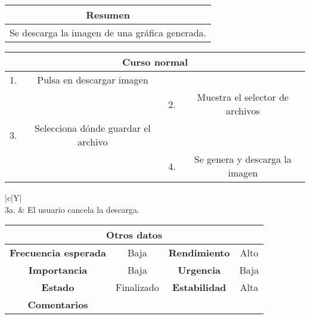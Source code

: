 \begin{table}[!h]
\begin{tabular}{|c|}
\hline
\cellcolor{cyan} \textbf{Resumen}  \\
\hline
Se descarga la imagen de una gráfica generada. \\
\hline
\end{tabular}
\end{table}

\begin{table}[!h]
\begin{tabular}{|c|c|c|c|}
\hline
\multicolumn{4}{|c|}{\cellcolor{cyan} \textbf{Curso normal}} \\
\hline
     1.         &     Pulsa en descargar imagen           &              &              \\
\hline
              &               &    2.          &     Muestra el selector de archivos         \\
\hline
     3.         &     Selecciona dónde guardar el archivo          &              &             \\
\hline
               &                                            &    4.   & Se genera y descarga la imagen \\
\hline
\end{tabular}
\end{table}

\begin{table}[!h]
\begin{tabularx}{\textwidth}{|c|Y|}
\hline
{} \\
\hline
     3a.         &    El usuario cancela la descarga.    \\
\hline
\end{tabularx}
\end{table}

\begin{table}[!h]
\begin{tabular}{|c|c|c|c|}
\hline
\multicolumn{4}{|c|}{\cellcolor{cyan} \textbf{Otros datos}} \\
\hline
 \cellcolor{cyan} \textbf{Frecuencia esperada}             &      Baja         &    \cellcolor{cyan} \textbf{Rendimiento}          &      Alto        \\
\hline
 \cellcolor{cyan} \textbf{Importancia}             &      Baja         &     \cellcolor{cyan} \textbf{Urgencia}         &      Baja        \\
\hline
 \cellcolor{cyan} \textbf{Estado}             &       Finalizado        &    \cellcolor{cyan} \textbf{Estabilidad}          &     Alta         \\
\hline
\cellcolor{cyan} \textbf{Comentarios}        &  \multicolumn{3}{|c|}{} \\
\hline
\end{tabular}
\end{table}

